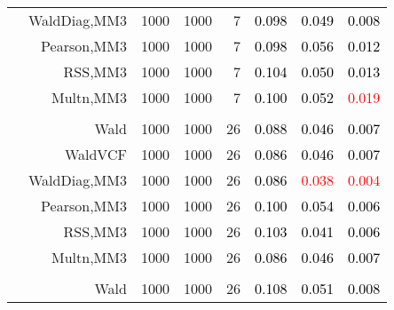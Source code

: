 \documentclass[
]{article}
\begin{document}
\begin{table}[H]
{\begin{tabular}[t]{lrrrrrrr}
\hspace{1em} & WaldDiag,MM3 & 1000 & 1000 & 7 & \textcolor{black}{0.098} & \textcolor{black}{0.049} & \textcolor{black}{0.008}\\

\hspace{1em} & Pearson,MM3 & 1000 & 1000 & 7 & \textcolor{black}{0.098} & \textcolor{black}{0.056} & \textcolor{black}{0.012}\\

\hspace{1em} & RSS,MM3 & 1000 & 1000 & 7 & \textcolor{black}{0.104} & \textcolor{black}{0.050} & \textcolor{black}{0.013}\\

\hspace{1em} & Multn,MM3 & 1000 & 1000 & 7 & \textcolor{black}{0.100} & \textcolor{black}{0.052} & \textcolor{red}{0.019}\\
\cmidrule{1-8}
\addlinespace[0.3em]
\multicolumn{8}{l}{\textbf{1F 15V}}\\
\hspace{1em} & Wald & 1000 & 1000 & 26 & \textcolor{black}{0.088} & \textcolor{black}{0.046} & \textcolor{black}{0.007}\\

\hspace{1em} & WaldVCF & 1000 & 1000 & 26 & \textcolor{black}{0.086} & \textcolor{black}{0.046} & \textcolor{black}{0.007}\\

\hspace{1em} & WaldDiag,MM3 & 1000 & 1000 & 26 & \textcolor{black}{0.086} & \textcolor{red}{0.038} & \textcolor{red}{0.004}\\

\hspace{1em} & Pearson,MM3 & 1000 & 1000 & 26 & \textcolor{black}{0.100} & \textcolor{black}{0.054} & \textcolor{black}{0.006}\\

\hspace{1em} & RSS,MM3 & 1000 & 1000 & 26 & \textcolor{black}{0.103} & \textcolor{black}{0.041} & \textcolor{black}{0.006}\\

\hspace{1em} & Multn,MM3 & 1000 & 1000 & 26 & \textcolor{black}{0.086} & \textcolor{black}{0.046} & \textcolor{black}{0.007}\\
\cmidrule{1-8}
\addlinespace[0.3em]
\multicolumn{8}{l}{\textbf{2F 10V}}\\
\hspace{1em} & Wald & 1000 & 1000 & 26 & \textcolor{black}{0.108} & \textcolor{black}{0.051} & \textcolor{black}{0.008}\\


\end{tabular}}
\end{table}
\end{document}
